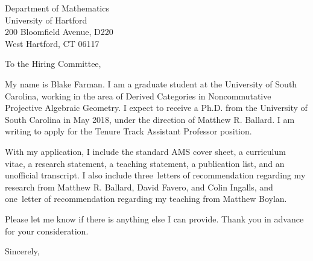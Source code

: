 \documentclass[12pt]{letter}
\date{\today}
\def\MSPRF{As requested in the posting, I have applied for an NSF Mathematical Sciences Postdoctoral Fellowship.
  If awarded, I plan to use it to carry out the proposed research laid out in my research statement at the University of Glasgow under the direction of Michael Wemyss.}
\def\position{Tenure Track Assistant Professor position}
\def\materials{the standard AMS cover sheet,
  a curriculum vitae,
  a research statement,
  a teaching statement,
  a publication list,
  and an unofficial transcript}
\def\contacts{Ettore Aldrovandi}
\def\numresrefs{three}
\def\numteachrefs{one}
\def\refs{Matthew R. Ballard, David Favero, and Colin Ingalls}
\def\teachingrefs{Matthew Boylan}
\begin{document}
\begin{letter}{
    Department of Mathematics\\
    University of Hartford\\
    200 Bloomfield Avenue, D220\\
    West Hartford, CT 06117\\
  }
  \opening{To the Hiring Committee,}
  
  My name is Blake Farman.
  I am a graduate student at the University of South Carolina, working in the area of Derived Categories in Noncommutative Projective Algebraic Geometry.
  I expect to receive a Ph.D. from the University of South Carolina in May 2018, under the direction of Matthew R. Ballard.
  I am writing to apply for the \position.



  With my application, I include \materials.
  I also include \numresrefs\  letters of recommendation regarding my research from \refs, and \numteachrefs\ letter of recommendation regarding my teaching from \teachingrefs.

  
  Please let me know if there is anything else I can provide.
  Thank you in advance for your consideration.
  \closing{Sincerely,}
\end{letter}
\end{document}
